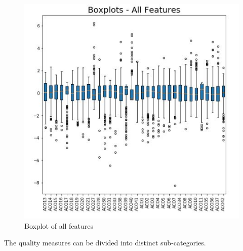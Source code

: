 \documentclass[conference]{IEEEtran}
\begin{document}
\begin{figure}[H]
    \centering
    \includegraphics{BoxPlots_ALL.jpg}
    \caption{Boxplot of all features}
    \label{fig:boxall}
\end{figure}

The quality measures can be divided into distinct sub-categories. 
\end{document}
